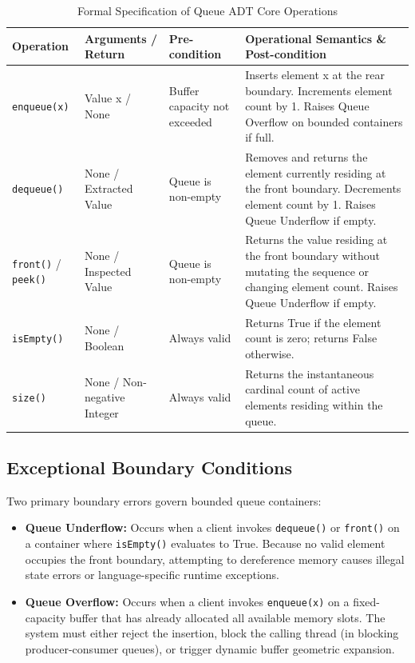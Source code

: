 \documentclass[10pt,journal,compsoc,onecolumn]{IEEEtran}
\begin{document}
\begin{table}[htbp]
\centering
\caption{Formal Specification of Queue ADT Core Operations}
\label{tab:queue_operations}
\begin{tabular}{lp{3.5cm}p{3.5cm}p{5.5cm}}
\toprule
\textbf{Operation} & \textbf{Arguments / Return} & \textbf{Pre-condition} & \textbf{Operational Semantics \& Post-condition} \\
\midrule
\texttt{enqueue(x)} & Value x / None & Buffer capacity not exceeded & Inserts element x at the rear boundary. Increments element count by 1. Raises Queue Overflow on bounded containers if full. \\
\midrule
\texttt{dequeue()} & None / Extracted Value & Queue is non-empty & Removes and returns the element currently residing at the front boundary. Decrements element count by 1. Raises Queue Underflow if empty. \\
\midrule
\texttt{front()} / \texttt{peek()} & None / Inspected Value & Queue is non-empty & Returns the value residing at the front boundary without mutating the sequence or changing element count. Raises Queue Underflow if empty. \\
\midrule
\texttt{isEmpty()} & None / Boolean & Always valid & Returns True if the element count is zero; returns False otherwise. \\
\midrule
\texttt{size()} & None / Non-negative Integer & Always valid & Returns the instantaneous cardinal count of active elements residing within the queue. \\
\bottomrule
\end{tabular}
\end{table}

\subsection{Exceptional Boundary Conditions}
Two primary boundary errors govern bounded queue containers:
\begin{itemize}
    \item \textbf{Queue Underflow:} Occurs when a client invokes \texttt{dequeue()} or \texttt{front()} on a container where \texttt{isEmpty()} evaluates to True. Because no valid element occupies the front boundary, attempting to dereference memory causes illegal state errors or language-specific runtime exceptions.
    \item \textbf{Queue Overflow:} Occurs when a client invokes \texttt{enqueue(x)} on a fixed-capacity buffer that has already allocated all available memory slots. The system must either reject the insertion, block the calling thread (in blocking producer-consumer queues), or trigger dynamic buffer geometric expansion.
\end{itemize}
\end{document}
